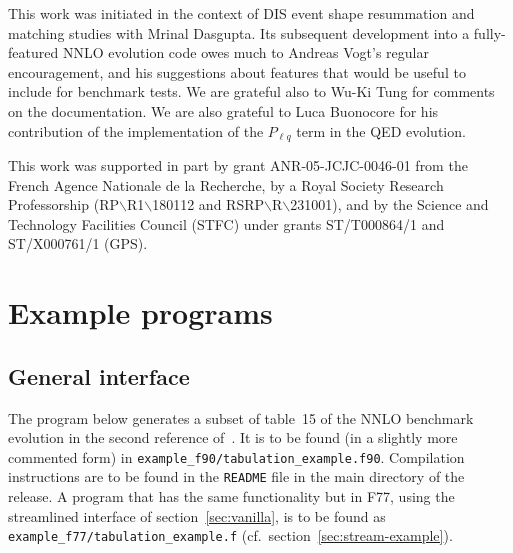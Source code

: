 \documentclass[12pt]{article}
\newcommand{\ttt}[1]{\texttt{#1}}
\begin{document}
This work was initiated in the context of DIS event shape resummation
and matching studies \cite{Dasgupta:2001eq,Dasgupta:2002dc} with Mrinal Dasgupta.
%
Its subsequent development into a fully-featured NNLO evolution code
owes much to Andreas Vogt's regular encouragement, and his suggestions
about features that would be useful to include for benchmark tests.
We are grateful also to Wu-Ki Tung for comments on the documentation.
%
We are also grateful to Luca Buonocore for his contribution of the
implementation of the $P_{\ell q}$ term in the QED evolution.

This work was supported in part by grant ANR-05-JCJC-0046-01 from the
French Agence Nationale de la Recherche,
%
by a Royal Society Research Professorship
(RP$\backslash$R1$\backslash$180112 and RSRP$\backslash$R$\backslash$231001),
%
and by the Science and Technology Facilities Council (STFC) under grants
ST/T000864/1 and ST/X000761/1 (GPS).

\appendix


\section{Example programs}
\label{sec:example_program}

\subsection{General interface}
\label{sec:example_gen}

The program below generates a subset of table~15 of the NNLO benchmark
evolution in the second reference of~\cite{Giele:2002hx,Dittmar:2005ed}. It is to be
found (in a slightly more commented form) in
\ttt{example\_f90/tabulation\_example.f90}. Compilation instructions
are to be found in the \ttt{README} file in the main directory of the
release. A program that has the same functionality but in F77, using
the streamlined interface of section~\ref{sec:vanilla}, is to be found as
\ttt{example\_f77/tabulation\_example.f} (cf.\ section~\ref{sec:stream-example}).
\end{document}
